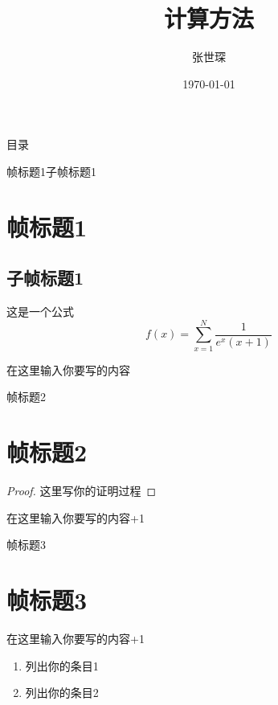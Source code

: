 \documentclass[cjk]{beamer}
\title{计算方法}
\author{张世琛}
\institute{计科1802\\ 计算机科学与技术学院}
\date{\today}
\begin{document}
\frame{\titlepage}

\begin{frame}{目录}
    \tableofcontents
\end{frame}

\begin{frame}{帧标题1}{子帧标题1}
    \section{帧标题1}
    \subsection{子帧标题1} 

    \begin{block}{这是一个公式}
        $$f(x)=\sum_{x=1}^N{\dfrac{1}{e^x(x+1)}}$$
    \end{block}
    在这里输入你要写的内容
\end{frame}

\begin{frame}{帧标题2}
    \section{帧标题2}
    \begin{proof}
        这里写你的证明过程
    \end{proof}
    在这里输入你要写的内容+1
\end{frame}

\begin{frame}{帧标题3}
    \section{帧标题3}
    在这里输入你要写的内容+1\par
    \begin{enumerate}
        \item<1->列出你的条目1
        \item<2->列出你的条目2
    \end{enumerate}
\end{frame}
\end{document}
